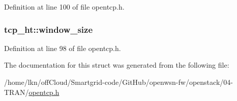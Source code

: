 Definition at line 100 of file opentcp.\+h.

\subsubsection[{\texorpdfstring{window\+\_\+size}{window_size}}]{ tcp\+\_\+ht\+::window\+\_\+size}\hypertarget{structtcp__ht_a857891d90f550100319b144d34f91752}{}\label{structtcp__ht_a857891d90f550100319b144d34f91752}


Definition at line 98 of file opentcp.\+h.



The documentation for this struct was generated from the following file\+:\begin{DoxyCompactItemize}
\item 
/home/lkn/off\+Cloud/\+Smartgrid-\/code/\+Git\+Hub/openwsn-\/fw/openstack/04-\/\+T\+R\+A\+N/\hyperlink{opentcp_8h}{opentcp.\+h}\end{DoxyCompactItemize}
